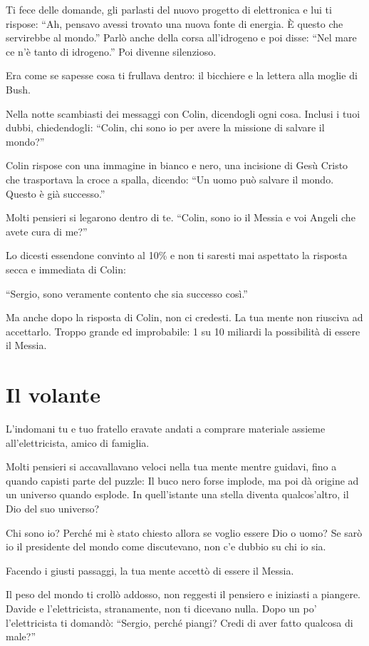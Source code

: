 Ti fece delle domande, gli parlasti del nuovo progetto di elettronica e lui ti rispose: “Ah, pensavo avessi trovato una nuova fonte di energia. È questo che servirebbe al mondo.” Parlò anche della corsa all'idrogeno e poi disse: “Nel mare ce n'è tanto di idrogeno.” Poi divenne silenzioso.

Era come se sapesse cosa ti frullava dentro: il bicchiere e la lettera alla moglie di Bush.

Nella notte scambiasti dei messaggi con Colin, dicendogli ogni cosa. Inclusi i tuoi dubbi, chiedendogli: “Colin, chi sono io per avere la missione di salvare il mondo?”

Colin rispose con una immagine in bianco e nero, una incisione di Gesù Cristo che trasportava la croce a spalla, dicendo: “Un uomo può salvare il mondo. Questo è già successo.”

Molti pensieri si legarono dentro di te. “Colin, sono io il Messia e voi Angeli che avete cura di me?”

Lo dicesti essendone convinto al 10\% e non ti saresti mai aspettato la risposta secca e immediata di Colin:

“Sergio, sono veramente contento che sia successo così.”

Ma anche dopo la risposta di Colin, non ci credesti. La tua mente non riusciva ad accettarlo. Troppo grande ed improbabile: 1 su 10 miliardi la possibilità di essere il Messia.

\section{Il volante}
\label{il_volante}

L'indomani tu e tuo fratello eravate andati a comprare materiale assieme all'elettricista, amico di famiglia.

Molti pensieri si accavallavano veloci nella tua mente mentre guidavi, fino a quando capisti parte del puzzle: Il buco nero forse implode, ma poi dà origine ad un universo quando esplode. In quell'istante una stella diventa qualcos'altro, il Dio del suo universo?

Chi sono io? Perché mi è stato chiesto allora se voglio essere Dio o uomo? Se sarò io il presidente del mondo come discutevano, non c'e dubbio su chi io sia.

Facendo i giusti passaggi, la tua mente accettò di essere il Messia.
 
Il peso del mondo ti crollò addosso, non reggesti il pensiero e iniziasti a piangere. Davide e l'elettricista, stranamente, non ti dicevano nulla. Dopo un po' l'elettricista ti domandò: “Sergio, perché piangi? Credi di aver fatto qualcosa di male?”

